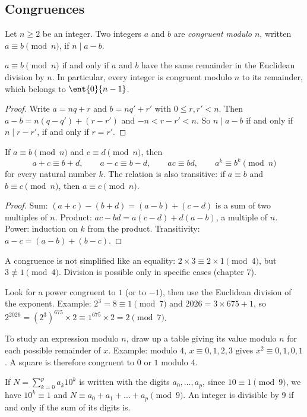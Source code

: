 \subsection{Congruences}
\begin{definition}
Let $n\ge2$ be an integer. Two integers $a$ and $b$ are \emph{congruent modulo $n$}, written $a\equiv b\pmod n$, if $n\mid a-b$.
\end{definition}
\begin{theorem}
$a\equiv b\pmod n$ if and only if $a$ and $b$ have the same remainder in the Euclidean division by $n$. In particular, every integer is congruent modulo $n$ to its remainder, which belongs to $\ent{0}{n-1}$.
\end{theorem}
\begin{proof}
Write $a=nq+r$ and $b=nq'+r'$ with $0\le r,r'<n$. Then $a-b=n(q-q')+(r-r')$ and $-n<r-r'<n$. So $n\mid a-b$ if and only if $n\mid r-r'$, if and only if $r=r'$.
\end{proof}
\begin{theorem}
If $a\equiv b\pmod n$ and $c\equiv d\pmod n$, then
\[a+c\equiv b+d,\qquad a-c\equiv b-d,\qquad ac\equiv bd,\qquad a^k\equiv b^k\pmod n\]
for every natural number $k$. The relation is also transitive: if $a\equiv b$ and $b\equiv c\pmod n$, then $a\equiv c\pmod n$.
\end{theorem}
\begin{proof}
Sum: $(a+c)-(b+d)=(a-b)+(c-d)$ is a sum of two multiples of $n$. Product: $ac-bd=a(c-d)+d(a-b)$, a multiple of $n$. Power: induction on $k$ from the product. Transitivity: $a-c=(a-b)+(b-c)$.
\end{proof}
\begin{pitfall}
A congruence is not simplified like an equality: $2\times3\equiv2\times1\pmod4$, but $3\not\equiv1\pmod4$. Division is possible only in specific cases (chapter 7).
\end{pitfall}
\begin{method}
Look for a power congruent to $1$ (or to $-1$), then use the Euclidean division of the exponent. Example: $2^3=8\equiv1\pmod7$ and $\num{2026}=3\times675+1$, so $2^{2026}=\left(2^3\right)^{675}\times2\equiv1^{675}\times2=2\pmod7$.
\end{method}
\begin{method}
To study an expression modulo $n$, draw up a table giving its value modulo $n$ for each possible remainder of $x$. Example: modulo $4$, $x\equiv0,1,2,3$ gives $x^2\equiv0,1,0,1$. A square is therefore congruent to $0$ or $1$ modulo $4$.
\end{method}
\begin{method}
If $N=\sum_{k=0}^{p}a_k10^k$ is written with the digits $a_0,\dots,a_p$, since $10\equiv1\pmod9$, we have $10^k\equiv1$ and $N\equiv a_0+a_1+\dots+a_p\pmod9$. An integer is divisible by $9$ if and only if the sum of its digits is.
\end{method}

